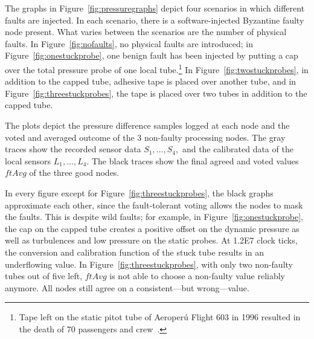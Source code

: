 




The graphs in Figure~\ref{fig:pressuregraphs} depict four scenarios in which
different faults are injected.  In each scenario, there is a software-injected
Byzantine faulty node present.  What varies between the scenarios are the number
of physical faults.  In Figure~\ref{fig:nofaults}, no physical faults are
introduced; in Figure~\ref{fig:onestuckprobe}, one benign fault has been injected by
  putting a cap over the total pressure probe of one local tube.\footnote{Tape
    left on the static pitot tube of Aeroper\'{u} Flight 603 in 1996 resulted in
    the death of 70 passengers and crew~\cite{aeroperu}.}  In
  Figure~\ref{fig:twostuckprobes}, in addition to the capped tube, adhesive tape is placed over another
  tube, and in Figure~\ref{fig:threestuckprobes}, the tape is placed over two
  tubes in addition to the capped tube.

The plots depict the pressure difference samples logged at each node and the
voted and averaged outcome of the 3 non-faulty processing nodes.  The
gray traces show the recorded sensor data $S_1, \dots, S_4,$ and the
calibrated data of the local sensors $L_1, \dots, L_4$. The black
traces show the final agreed and voted values $ftAvg$ of the three
good nodes.

In every figure except for Figure~\ref{fig:threestuckprobes}, the black graphs
approximate each other, since the fault-tolerant voting allows the nodes to mask
the faults.  This is despite wild faults; for example, in
Figure~\ref{fig:onestuckprobe}, the cap on the capped tube creates a positive
offset on the dynamic pressure as well as turbulences and low pressure on the
static probes. At 1.2E7 clock ticks, the conversion and calibration function of
the stuck tube results in an underflowing value.  In
Figure~\ref{fig:threestuckprobes}, with only two non-faulty tubes out of five
left, $ftAvg$ is not able to choose a non-faulty value reliably anymore.
All nodes still agree on a consistent---but wrong---value.

